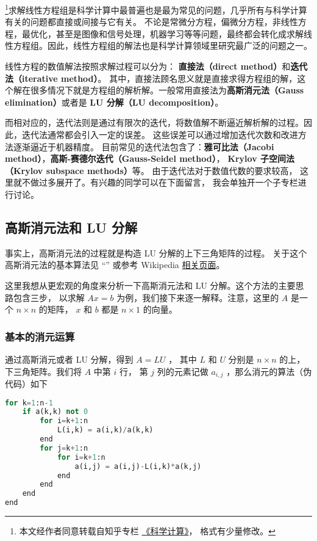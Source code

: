 

\footnote{本文经作者同意转载自知乎专栏 \href{https://www.zhihu.com/column/c_1226443594048942080}{《科学计算》}， 格式有少量修改。}求解线性方程组是科学计算中最普遍也是最为常见的问题，几乎所有与科学计算有关的问题都直接或间接与它有关。 不论是常微分方程，偏微分方程，非线性方程，最优化，甚至是图像和信号处理，机器学习等等问题，最终都会转化成求解线性方程组。因此，线性方程组的解法也是科学计算领域里研究最广泛的问题之一。

线性方程的数值解法按照求解过程可以分为： \textbf{直接法（direct method）}和\textbf{迭代法（iterative method）}。 其中，直接法顾名思义就是直接求得方程组的解，这个解在很多情况下就是方程组的解析解。一般常用直接法为\textbf{高斯消元法（Gauss elimination）}或者是 \textbf{LU 分解（LU decomposition）}。

而相对应的，迭代法则是通过有限次的迭代，将数值解不断逼近解析解的过程。因此，迭代法通常都会引入一定的误差。 这些误差可以通过增加迭代次数和改进方法逐渐逼近于机器精度。 目前常见的迭代法包含了：\textbf{雅可比法（Jacobi method）}，\textbf{高斯-赛德尔迭代（Gauss-Seidel method）}， \textbf{Krylov 子空间法（Krylov subspace methods）}等。 由于迭代法对于数值代数的要求较高， 这里就不做过多展开了。有兴趣的同学可以在下面留言， 我会单独开一个子专栏进行讨论。

\subsection{高斯消元法和 LU 分解}

事实上，高斯消元法的过程就是构造 LU 分解的上下三角矩阵的过程。 关于这个高斯消元法的基本算法见 “” 或参考 Wikipedia \href{https://en.wikipedia.org/wiki/Gaussian_elimination}{相关页面}。

这里我想从更宏观的角度来分析一下高斯消元法和 LU 分解。这个方法的主要思路包含三步， 以求解 $Ax=b$ 为例，我们接下来逐一解释。注意，这里的 $A$  是一个 $n\times n$ 的矩阵， $x$ 和 $b$ 都是 $n\times1$ 的向量。

\subsubsection{基本的消元运算}

通过高斯消元或者 LU 分解，得到 $A=LU$ ， 其中 $L$ 和 $U $ 分别是 $n\times n$ 的上，下三角矩阵。我们将 $A$ 中第 $i$ 行， 第 $j$ 列的元素记做 $a_{i,j}$ ，那么消元的算法（伪代码）如下
\begin{lstlisting}[language=python]
for k=1:n-1
    if a(k,k) not 0
        for i=k+1:n
            L(i,k) = a(i,k)/a(k,k)
        end
        for j=k+1:n
            for i=k+1:n
                a(i,j) = a(i,j)-L(i,k)*a(k,j)
            end
        end
    end
end
\end{lstlisting}

